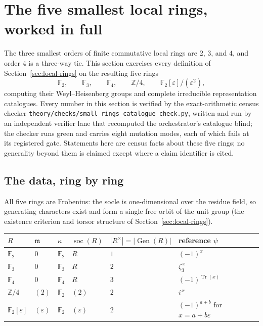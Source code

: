 \section{The five smallest local rings, worked in full}
\label{sec:smallest-rings}

The three smallest orders of finite commutative local rings are $2$, $3$,
and $4$, and order $4$ is a three-way tie.  This section exercises every
definition of Section~\ref{sec:local-rings} on the resulting five rings
\[
\mathbb F_2,\qquad \mathbb F_3,\qquad \mathbb F_4,\qquad
\mathbb Z/4,\qquad \mathbb F_2[\varepsilon]/(\varepsilon^2),
\]
computing their Weyl--Heisenberg groups and complete irreducible
representation catalogues.  Every number in this section is verified by the
exact-arithmetic census checker
\texttt{theory/checks/small\_rings\_catalogue\_check.py}, written and run by
an independent verifier lane that recomputed the orchestrator's catalogue
blind; the checker runs green and carries eight mutation modes, each of
which fails at its registered gate.  Statements here are census facts about
these five rings; no generality beyond them is claimed except where a claim
identifier is cited.

\subsection{The data, ring by ring}

All five rings are Frobenius: the socle is one-dimensional over the residue
field, so generating characters exist and form a single free orbit of the
unit group (the existence criterion and torsor structure of
Section~\ref{sec:local-rings}).

\begin{center}
\begin{tabular}{llllll}
$R$ & $\mathfrak m$ & $\kappa$ & $\operatorname{soc}(R)$ &
$|R^\times|=|\operatorname{Gen}(R)|$ & reference $\psi$\\
\hline
$\mathbb F_2$ & $0$ & $\mathbb F_2$ & $R$ & $1$ & $(-1)^{x}$\\
$\mathbb F_3$ & $0$ & $\mathbb F_3$ & $R$ & $2$ & $\zeta_3^{\,x}$\\
$\mathbb F_4$ & $0$ & $\mathbb F_4$ & $R$ & $3$ & $(-1)^{\operatorname{Tr}(x)}$\\
$\mathbb Z/4$ & $(2)$ & $\mathbb F_2$ & $(2)$ & $2$ & $i^{\,x}$\\
$\mathbb F_2[\varepsilon]$ & $(\varepsilon)$ & $\mathbb F_2$ &
$(\varepsilon)$ & $2$ & $(-1)^{a+b}$ for $x=a+b\varepsilon$\\
\end{tabular}
\end{center}

